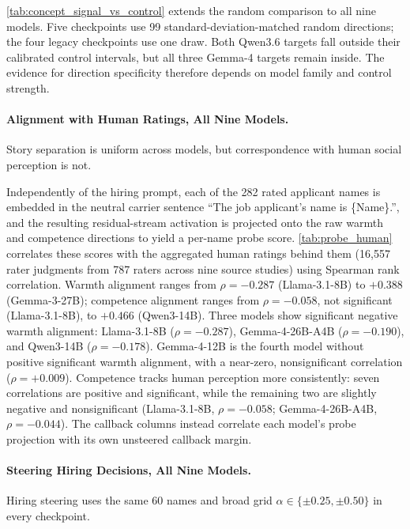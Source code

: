 \documentclass[twocolumn]{article}
\newcommand{\tabledir}{../../results/tables}
\begin{document}
\autoref{tab:concept_signal_vs_control} extends the random comparison to all
nine models. Five checkpoints use 99 standard-deviation-matched random
directions; the four legacy checkpoints use one draw. Both Qwen3.6 targets
fall outside their calibrated control intervals, but all three Gemma-4
targets remain inside. The evidence for direction specificity therefore
depends on model family and control strength.



\paragraph{Alignment with Human Ratings, All Nine Models.}
Story separation is uniform across models, but correspondence with human
social perception is not.

Independently of the hiring prompt, each of the 282 rated applicant names
is embedded in the neutral carrier sentence ``The job applicant's name is
\{Name\}.'', and the resulting residual-stream activation is projected onto
the raw warmth and competence directions to yield a per-name probe score.
\autoref{tab:probe_human} correlates these scores with the aggregated human
ratings behind them (16{,}557 rater judgments from 787 raters across nine
source studies) using Spearman rank correlation. Warmth alignment ranges
from $\rho = -0.287$ (Llama-3.1-8B) to $+0.388$ (Gemma-3-27B); competence
alignment ranges from $\rho = -0.058$, not significant (Llama-3.1-8B), to
$+0.466$ (Qwen3-14B). Three models show significant negative warmth
alignment: Llama-3.1-8B ($\rho=-0.287$), Gemma-4-26B-A4B
($\rho=-0.190$), and Qwen3-14B ($\rho=-0.178$). Gemma-4-12B is the fourth
model without positive significant warmth alignment, with a near-zero,
nonsignificant correlation ($\rho=+0.009$). Competence tracks human
perception more consistently: seven correlations are positive and
significant, while the remaining two are slightly negative and
nonsignificant (Llama-3.1-8B, $\rho=-0.058$; Gemma-4-26B-A4B,
$\rho=-0.044$). The callback columns instead correlate each model's probe
projection with its own unsteered callback margin.



\paragraph{Steering Hiring Decisions, All Nine Models.}
Hiring steering uses the same 60 names and broad grid
$\alpha\in\{\pm0.25,\pm0.50\}$ in every checkpoint.
\end{document}
